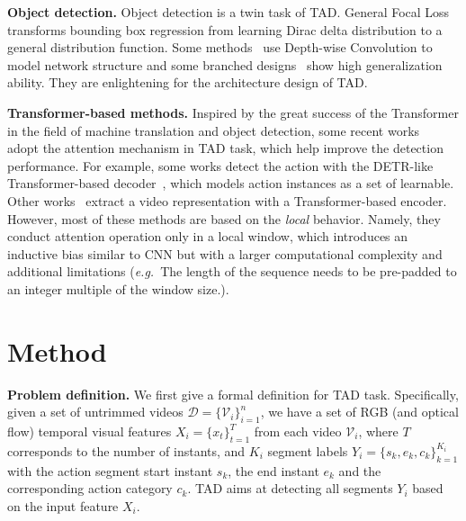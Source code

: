 \documentclass[10pt,twocolumn,letterpaper]{article}
\def\eg{{\em e.g.}}
\newcommand{\myPara}[1]{\vspace{.05in}\noindent\textbf{#1}}
\newcommand{\mc}[1]{\mathcal{#1}}
\begin{document}
\myPara{Object detection.}
Object detection is a twin task of TAD. General Focal Loss~\cite{li2020generalized} transforms bounding box regression from learning Dirac delta distribution to a general distribution function. Some methods~\cite{howard2017mobilenets,chollet2017xception,liu2022convnet} use Depth-wise Convolution to model network structure and some branched designs~\cite{szegedy2017inception,hu2018squeeze} show high generalization ability. They are enlightening for the architecture design of TAD.

\myPara{Transformer-based methods.}
Inspired by the great success of the Transformer in the field of machine translation and object detection, some recent  works~\cite{zhang2022actionformer, shi2022react, tan2021relaxed, cheng2022tallformer,liu2022end,liu2022empirical} adopt the attention mechanism in TAD task, which help improve the detection performance. For example, some works\cite{tan2021relaxed,shi2022react,liu2022end} detect the action with the DETR-like Transformer-based decoder~\cite{carion2020end}, which models action instances as a set of learnable. Other works~\cite{zhang2022actionformer,cheng2022tallformer} extract a video representation with a Transformer-based encoder. However, most of these methods are based on the \emph{local} behavior. Namely, they conduct attention operation only in a local window, which introduces an inductive bias similar to CNN but with a larger computational complexity and additional limitations (\eg~The length of the sequence needs to be pre-padded to an integer multiple of the window size.). 


\section{Method}
\myPara{Problem definition.} We first give a formal definition for TAD task. Specifically, given a set of untrimmed videos $\mc{D}=\{\mc{V}_i\}_{i=1}^{n}$, we have a set of RGB (and optical flow) temporal visual features $X_i=\{{x_t}\}_{t=1}^T$ from each video $\mc{V}_i$, where $T$ corresponds to the number of instants, and $K_i$ segment labels $Y_i=\{s_k,e_k,c_k\}_{k=1}^{K_i}$ with the action segment start instant $s_k$, the end instant $e_k$ and the corresponding action category $c_k$. TAD aims at detecting all segments $Y_i$ based on the input feature $X_i$. 
\end{document}
